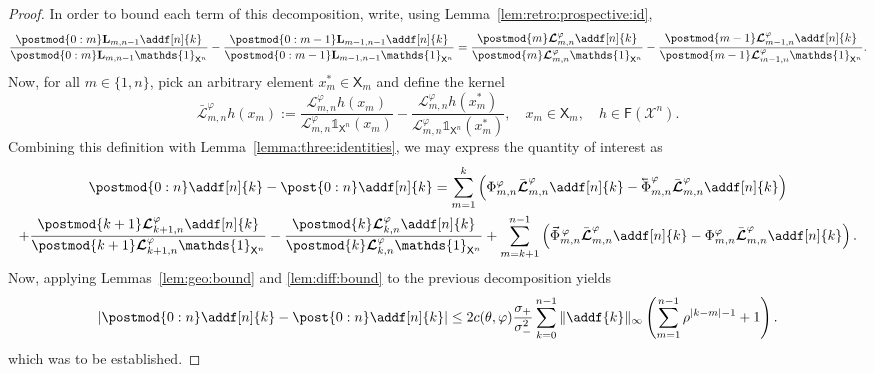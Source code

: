 \documentclass{article}
\newcommand{\retrokmodnorm}{\bar{\boldsymbol{\mathcal{L}}}^{\precpar}}
\newcommand{\xarb}{x^\ast}
\newcommand{\Xfd}{\mathcal{X}}
\newcommand{\cev}[1]{\reflectbox{\ensuremath{\vec{\reflectbox{\ensuremath{#1}}}}}}
\newcommand{\shiftbwd}{\cev{\shiftsymbol}^{\precpar}}
\newcommand{\shiftfwd}{\vec{\shiftsymbol}^{\, \precpar}}
\newcommand{\shiftsymbol}{\Phi}
\newcommand{\precpar}{\varphi}
\newcommand{\intvect}[2]{\{ #1, #2 \}}
\newcommand{\noshift}{\shiftsymbol^{\precpar}}
\newcommand{\udlow}{\sigma_-}
\newcommand{\udup}{\sigma_+}
\newcommand{\1}{\mathbbm{1}}
\newcommand{\retrokmod}{\boldsymbol{\mathcal{L}}^\precpar}
\newcommand{\uk}[1]{\mathbf{L}_{#1}}
\newcommand{\Xset}{\mathsf{X}}
\newcommand{\bmf}[1]{\set{F}(#1)}
\newcommand{\set}[1]{\mathsf{#1}}
\def\1{\mathds{1}}
\newcommand{\eqdef}{\ensuremath{:=}}
\begin{document}
\begin{proof}
In order to bound each term of this decomposition, write, using Lemma~\ref{lem:retro:prospective:id},  
$$
\frac{\postmod{0:m} \uk{m, n - 1} \addf[n]{k}}{\postmod{0:m} \uk{m, n - 1} \1_{\Xset^n}} - \frac{\postmod{0:m - 1} \uk{m - 1, n - 1} \addf[n]{k}}{\postmod{0:m - 1} \uk{m - 1, n - 1} \1_{\Xset^n}} 
= \frac{\postmod{m} \retrokmod_{m, n} \addf[n]{k}}{\postmod{m} \retrokmod_{m, n} \1_{\Xset^n}} - \frac{\postmod{m - 1} \retrokmod_{m - 1, n} \addf[n]{k}}{\postmod{m - 1} \retrokmod_{m - 1, n} \1_{\Xset^n}}. 
$$
Now, for all $m \in \intvect{1}{n}$, pick an arbitrary element $\xarb_m \in \Xset_m$ and define the kernel 
\begin{equation} \label{eq:def:norm:objective:func}
\retrokmodnorm_{m, n} h(x_m) \eqdef \frac{\retrokmod_{m, n} h(x_m)}{\retrokmod_{m, n} \1_{\Xset^n}(x_m)} - \frac{\retrokmod_{m, n} h (\xarb_m)}{\retrokmod_{m, n} \1_{\Xset^n} (\xarb_m)}, \quad x_m \in \Xset_m, \quad h \in \bmf{\Xfd^n}. 
\end{equation}
Combining this definition with Lemma~\ref{lemma:three:identities}, we may express the quantity of interest as 
\begin{multline*}
\postmod{0:n} \addf[n]{k} - \post{0:n} \addf[n]{k} = \sum_{m = 1}^k \left( \noshift_{m, n} \retrokmodnorm_{m, n} \addf[n]{k} - \shiftbwd_{m, n}  \retrokmodnorm_{m, n} \addf[n]{k} \right) \\ 
+ \frac{\postmod{k + 1} \retrokmod_{k + 1, n} \addf[n]{k}}{\postmod{k + 1} \retrokmod_{k + 1, n} \1_{\Xset^n}} - \frac{\postmod{k} \retrokmod_{k, n} \addf[n]{k}}{\postmod{k} \retrokmod_{k, n} \1_{\Xset^n}} + \sum_{m = k + 1}^{n - 1} \left( \shiftfwd_{m, n} \retrokmodnorm_{m, n} \addf[n]{k} - \noshift_{m, n} \retrokmodnorm_{m, n} \addf[n]{k} \right). 
\end{multline*}
Now, applying Lemmas~\ref{lem:geo:bound} and \ref{lem:diff:bound} to the previous decomposition yields
$$
\left| \postmod{0:n} \addf[n]{k} - \post{0:n} \addf[n]{k} \right| \leq 2 c(\theta,\varphi) \frac{\udup }{\udlow^2} \sum_{k = 0}^{n - 1} \| \addf{k} \|_\infty \left( \sum_{m = 1}^{n - 1} \rho^{|k - m| - 1} + 1 \right).  
$$
which was to be established. 


\medskip
\medskip




\end{proof}
\end{document}
